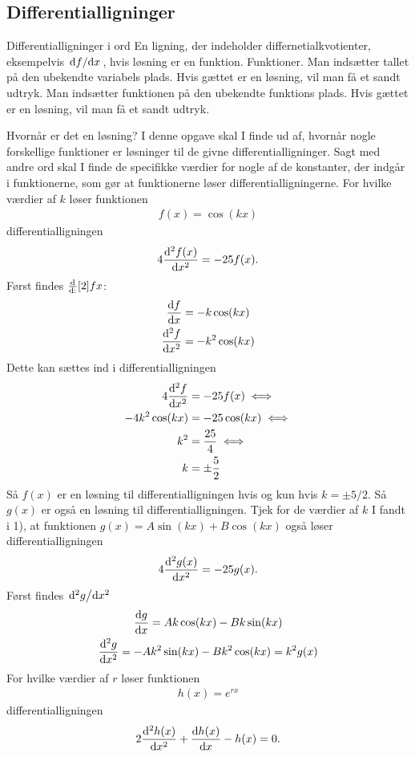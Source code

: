 \subsection*{Differentialligninger}
\begin{opgave}[1]{Differentialligninger i ord}
\opg En ligning, der indeholder differnetialkvotienter, eksempelvis $\dv*{f}{x}$, hvis løsning er en funktion.
\opg Funktioner.
\opg Man indsætter tallet på den ubekendte variabels plads. Hvis gættet er en løsning, vil man få et sandt udtryk.
\opg Man indsætter funktionen på den ubekendte funktions plads. Hvis gættet er en løsning, vil man få et sandt udtryk.
\end{opgave}

\begin{opgave}[2]{Hvornår er det en løsning?}
	I denne opgave skal I finde ud af, hvornår nogle forskellige funktioner er løsninger til de givne differentialligninger. Sagt med andre ord skal I finde de specifikke værdier for nogle af de konstanter, der indgår i funktionerne, som gør at funktionerne løser differentialligningerne.
	\opg For hvilke værdier af $k$ løser funktionen
	\begin{align*}
	f(x) = \cos (kx)
	\end{align*}
	differentialligningen
	\begin{align*}
	4 \dv[2]{f(x)}{x} = - 25f(x).
	\end{align*}
	Først findes $\dv:[2]{f}{x}$:
	\begin{align*}
	\dv{f}{x}&=-k\cos(kx)\\
	\dv[2]{f}{x}&=-k^2\cos(kx)
	\end{align*}
	Dette kan sættes ind i differentialligningen
	\begin{align*}
	    4\dv[2]{f}{x}&=-25f(x)\iff\\
	    -4k^2\cos(kx)&=-25\cos(kx)\iff\\
	    k^2&=\frac{25}{4}\iff\\
	    k&=\pm \frac{5}{2}
	\end{align*}
	Så $f(x)$ er en løsning til differentialligningen hvis og kun hvis $k=\pm5/2$.
		Så $g(x)$ er også en løsning til differentialligningen.
	\opg Tjek for de værdier af $k$ I fandt i 1), at funktionen $g(x) = A \sin (kx) + B \cos (kx)$ også løser differentialligningen
	\begin{align*}
	4 \dv[2]{g(x)}{x} = -25 g(x).
	\end{align*}
	Først findes $\dv*[2]{g}{x}$
	\begin{gather*}
	    \dv{g}{x}=Ak\cos(kx)-Bk\sin(kx)\\
	    \dv[2]{g}{x}=-Ak^2\sin(kx)-Bk^2\cos(kx)=k^2g(x)
	\end{gather*}
	\opg For hvilke værdier af $r$ løser funktionen
	\begin{align*}
	h(x) = e^{rx}
	\end{align*}
	differentialligningen
	\begin{align*}
	2 \dv[2]{h(x)}{x} + \dv{h(x)}{x} - h(x) = 0.
	\end{align*}
	

\end{opgave}
